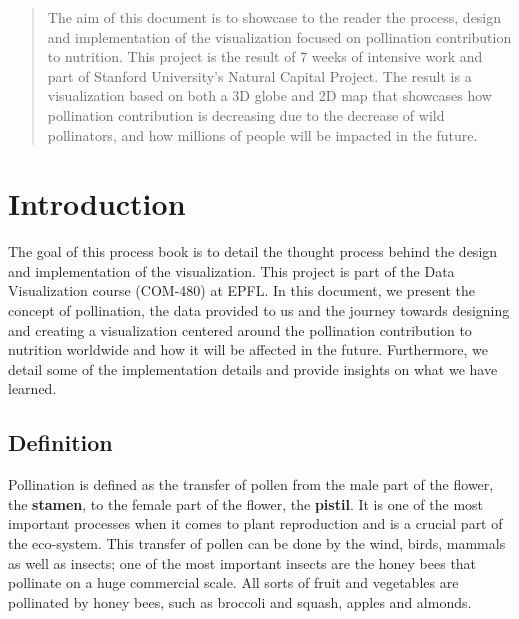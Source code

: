 \documentclass[12pt]{article}
\begin{document}

\tableofcontents
\pagebreak

\begin{abstract}
    The aim of this document is to showcase to the reader the process, design and implementation of the visualization focused on pollination contribution to nutrition. This project is the result of 7 weeks of intensive work and part of Stanford University's Natural Capital Project. The result is a visualization based on both a 3D globe and 2D map that showcases how pollination contribution is decreasing due to the decrease of wild pollinators, and how millions of people will be impacted in the future. 
\end{abstract}
\section{Introduction}
The goal of this process book is to detail the thought process behind the design and implementation of the visualization. This project is part of the Data Visualization course (COM-480) at EPFL. \newline
In this document, we present the concept of pollination, the data provided to us and the journey towards designing and creating a visualization centered around the pollination contribution to nutrition worldwide and how it will be affected in the future. Furthermore, we detail some of the implementation details and provide insights on what we have learned.
\subsection{Definition}
Pollination is defined as the transfer of pollen from the male part of the flower, the \textbf{stamen}, to the female part of the flower, the \textbf{pistil}. It is one of the most important processes when it comes to plant reproduction and is a crucial part of the eco-system. \newline
This transfer of pollen can be done by the wind, birds, mammals as well as insects; one of the most important insects are the honey bees that pollinate on a huge commercial scale. All sorts of fruit and vegetables are pollinated by honey bees, such as broccoli and squash, apples and almonds.
\end{document}
